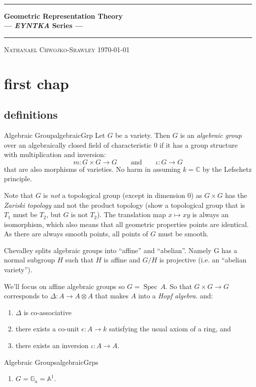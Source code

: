 \documentclass{book}
\def\title{Geometric Representation Theory}
\def\author{Nathanael Chwojko-Srawley}
\newlength{\drop}%
\newcommand*{\plogo}{\fbox{$\mathcal{PL}$}}
\newcommand{\titleUL}{\begingroup%
\drop=0.1\textheight
\vspace*{\drop}
\begin{center}
{\LARGE {\quad}}\\[\drop]

\rule{\textwidth}{1pt}\par
\vspace{0.5\baselineskip}
{\huge\bfseries \title\\[0.2\baselineskip]
\large --- \emph{EYNTKA} Series ---}\\[0.5\baselineskip]
\rule{\textwidth}{1pt}\par
\vfill
{\Large\textsc{\author}}
\vfill
\vfill
{\large \today}
\end{center}
\endgroup}
\renewcommand{\maketitle}{\titleUL}
\newcommand{\A}{{\mathbb{A}}}
\newcommand{\C}{{\mathbb{C}}}
\newcommand{\G}{{\mathbb{G}}}
\newcommand{\Spec}{{\operatorname{Spec}\,}}
\begin{document}
\maketitle
\tableofcontents
\newpage

\chapter{first chap}

\section{definitions}

\begin{defn}{Algebraic Group}{algebraicGrp}
  Let $G$ be a variety. Then $G$ is an \emph{algebraic group} over an algebraically closed field of
  characteristic $0$ if it has a group structure with multiplication and inversion:
  \[
    m: G\times G \to G \qquad \text{and} \qquad \iota: G \to G
  \]
  that are also morphisms of varieties. No harm in assuming $k = \C$ by the Lefschetz principle.
\end{defn}

Note that $G$ is \emph{not} a topological group (except in dimension $0$) as $G\times G$ has the \emph{Zariski topology} and not the
product topology (show a topological group that is $T_1$ must be $T_2$, but $G$ is not $T_2$).  The
translation map $x \mapsto xy$ is always an isomorphism, which also means that all geometric properties points
are identical. As there are always smooth points, all points of $G$ must be smooth.


Chevalley splits algebraic groups into ``affine'' and ``abelian''. Namely G has a normal subgroup $H$ such
that $H$ is affine and $G/H$ is projective (i.e. an ``abelian variety'').

We'll focus on affine algebraic groups so $G = \Spec A$. So that $G\times G \to G$ corresponds to $\Delta:
A \to A\otimes A$ that makes $A$ into a \emph{Hopf algebra}. and:
\begin{enumerate}
  \item $\Delta$ is co-associative
  \item there exists a co-unit $\epsilon:A \to k$ satisfying the usual axiom of a ring, and
  \item there exists an inversion $\iota: A \to A$.
\end{enumerate}

\begin{example}{Algebraic Groups}{algebraicGrps}
  \begin{enumerate}
    \item $G = \G_a = \A^1$.
  \end{enumerate}
\end{example}

\newpage
\printindex

\newpage
\printbibliography
\end{document}
